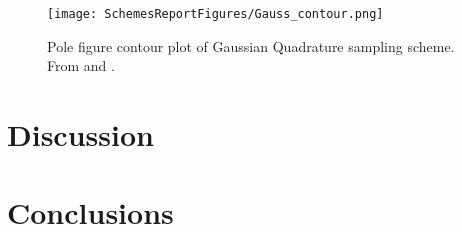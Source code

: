 \documentclass{article}
\begin{document}
\begin{figure}[ht]
    \centering
    \texttt{[image: SchemesReportFigures/Gauss\_contour.png]}
    \caption{Pole figure contour plot of Gaussian Quadrature sampling scheme. From \cite{Lan1} and \cite{Lan2}.}
\end{figure}




\section{Discussion}


\section{Conclusions}




%

\end{document}
